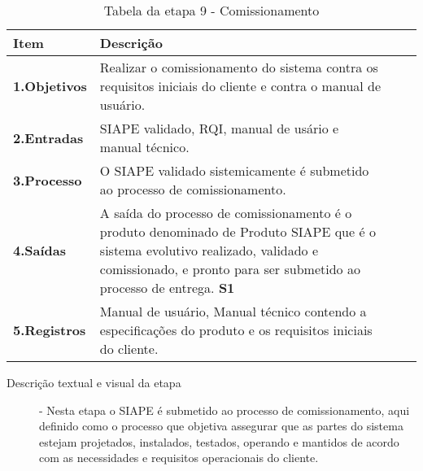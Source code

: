 \begin{table}[htbp]
	\centering
	\caption{Tabela da etapa 9 - Comissionamento}
	\begin{tabular}{|l| p{13.5cm}| c| c| } \hline
		\textbf{Item} 	    & \textbf{Descrição} 
		\\ \hline
		\textbf{1.Objetivos}	   &  
		Realizar o comissionamento do sistema contra os requisitos iniciais do cliente e contra o manual de usuário. 		
		\\ \hline
		\textbf{2.Entradas}	  &	
			
		SIAPE validado, RQI, manual de usário e manual técnico.
		\\ \hline	
		\textbf{3.Processo}     &
		O SIAPE validado sistemicamente é submetido ao processo de comissionamento. 
		\\ \hline
		\textbf{4.Saídas}		& 
		A saída do processo de comissionamento é o produto denominado de Produto SIAPE que é o sistema evolutivo realizado, validado e comissionado, e pronto para ser submetido ao processo de entrega. 
		\textbf{S1}  
		\\ \hline
		\textbf{5.Registros}   & 	
		Manual de usuário, Manual técnico contendo a especificações do produto e os requisitos iniciais do cliente.
		\\ \hline
	\end{tabular}
	\label{T11}\par
\end{table}

\begin{description}

\item[Descrição textual e visual da etapa] - Nesta etapa o SIAPE é submetido ao processo de comissionamento, aqui definido como o processo que objetiva assegurar que as partes do sistema estejam projetados, instalados, testados, operando e mantidos de acordo com as necessidades e requisitos operacionais do cliente. \par 


\end{description}

